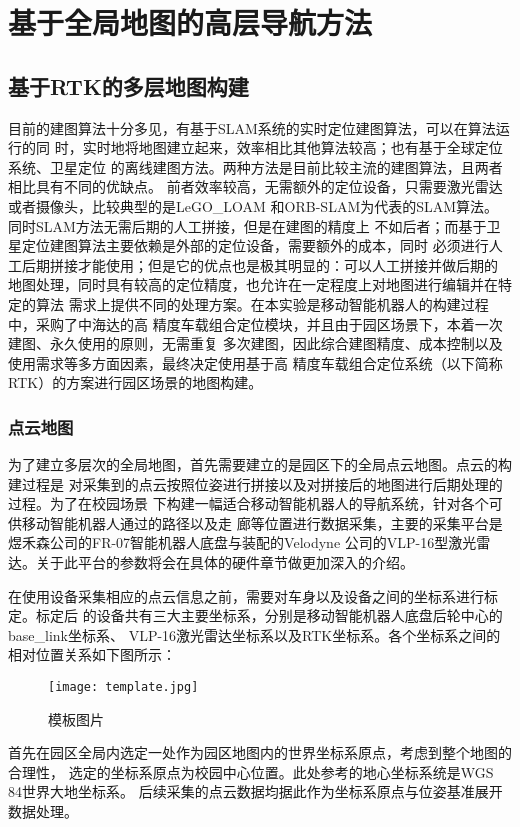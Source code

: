 \section{基于全局地图的高层导航方法}


\subsection{基于RTK的多层地图构建}
目前的建图算法十分多见，有基于SLAM系统的实时定位建图算法，可以在算法运行的同
时，实时地将地图建立起来，效率相比其他算法较高；也有基于全球定位系统、卫星定位
的离线建图方法。两种方法是目前比较主流的建图算法，且两者相比具有不同的优缺点。
前者效率较高，无需额外的定位设备，只需要激光雷达或者摄像头，比较典型的是LeGO\_LOAM
和ORB-SLAM为代表的SLAM算法。同时SLAM方法无需后期的人工拼接，但是在建图的精度上
不如后者；而基于卫星定位建图算法主要依赖是外部的定位设备，需要额外的成本，同时
必须进行人工后期拼接才能使用；但是它的优点也是极其明显的：可以人工拼接并做后期的
地图处理，同时具有较高的定位精度，也允许在一定程度上对地图进行编辑并在特定的算法
需求上提供不同的处理方案。在本实验是移动智能机器人的构建过程中，采购了中海达的高
精度车载组合定位模块，并且由于园区场景下，本着一次建图、永久使用的原则，无需重复
多次建图，因此综合建图精度、成本控制以及使用需求等多方面因素，最终决定使用基于高
精度车载组合定位系统（以下简称RTK）的方案进行园区场景的地图构建。

\subsubsection{点云地图}
为了建立多层次的全局地图，首先需要建立的是园区下的全局点云地图。点云的构建过程是
对采集到的点云按照位姿进行拼接以及对拼接后的地图进行后期处理的过程。为了在校园场景
下构建一幅适合移动智能机器人的导航系统，针对各个可供移动智能机器人通过的路径以及走
廊等位置进行数据采集，主要的采集平台是煜禾森公司的FR-07智能机器人底盘与装配的Velodyne
公司的VLP-16型激光雷达。关于此平台的参数将会在具体的硬件章节做更加深入的介绍。

在使用设备采集相应的点云信息之前，需要对车身以及设备之间的坐标系进行标定。标定后
的设备共有三大主要坐标系，分别是移动智能机器人底盘后轮中心的base\_link坐标系、
VLP-16激光雷达坐标系以及RTK坐标系。各个坐标系之间的相对位置关系如下图所示：
\begin{figure}[ht]
    \centering
    \texttt{[image: template.jpg]}
    \caption{模板图片}
\end{figure}

首先在园区全局内选定一处作为园区地图内的世界坐标系原点，考虑到整个地图的合理性，
选定的坐标系原点为校园中心位置。此处参考的地心坐标系统是WGS 84世界大地坐标系。
后续采集的点云数据均据此作为坐标系原点与位姿基准展开数据处理。

